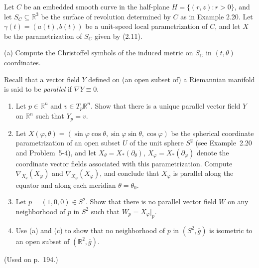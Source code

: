 \begin{exercise}
\label{prob:christoffel-symbols-surface-revolution}

Let $C$ be an embedded smooth curve in the half-plane $H = \{(r,z) : r > 0\}$, and let $S_C \subseteq \mathbb{R}^3$ be the surface of revolution determined by $C$ as in Example 2.20. Let $\gamma(t) = (a(t), b(t))$ be a unit-speed local parametrization of $C$, and let $X$ be the parametrization of $S_C$ given by (2.11).

(a) Compute the Christoffel symbols of the induced metric on $S_C$ in $(t,\theta)$ coordinates.
\end{exercise}

\begin{exercise}
\label{prob:parallel-vector-fields}

Recall that a vector field $Y$ defined on (an open subset of) a Riemannian manifold is said to be \emph{parallel} if $\nabla Y \equiv 0$.
\begin{enumerate}
\item[(a)] Let $p \in \mathbb{R}^n$ and $v \in T_p \mathbb{R}^n$. Show that there is a unique parallel vector field $Y$ on $\mathbb{R}^n$ such that $Y_p = v$.
\item[(b)] Let $X(\varphi, \theta) = (\sin \varphi \cos \theta, \sin \varphi \sin \theta, \cos \varphi)$ be the spherical coordinate parametrization of an open subset $U$ of the unit sphere $S^2$ (see Example~2.20 and Problem~5-4), and let $X_\theta = X_*(\partial_\theta)$, $X_\varphi = X_*(\partial_\varphi)$ denote the coordinate vector fields associated with this parametrization. Compute $\nabla_{X_\theta}(X_\varphi)$ and $\nabla_{X_\varphi}(X_\varphi)$, and conclude that $X_\varphi$ is parallel along the equator and along each meridian $\theta = \theta_0$.
\item[(c)] Let $p = (1, 0, 0) \in S^2$. Show that there is no parallel vector field $W$ on any neighborhood of $p$ in $S^2$ such that $W_p = X_\varphi|_p$.
\item[(d)] Use (a) and (c) to show that no neighborhood of $p$ in $(S^2, \overline{g})$ is isometric to an open subset of $(\mathbb{R}^2, \overline{g})$.
\end{enumerate}
(Used on p.\ 194.)
\end{exercise}

